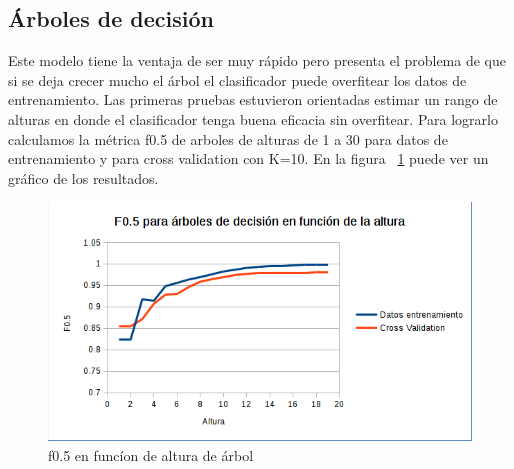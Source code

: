 
\subsection{Árboles de decisión}

Este modelo tiene la ventaja de ser muy rápido pero presenta el problema de que si se deja crecer mucho el árbol el clasificador puede overfitear los datos de entrenamiento. Las primeras pruebas estuvieron orientadas estimar un rango de alturas en donde el clasificador tenga buena eficacia sin overfitear. Para lograrlo calculamos la métrica  f0.5 de arboles de alturas de 1 a 30 para datos de entrenamiento y para cross validation con K=10. En la figura ~\ref{fig:arboles_f05_en_funcion_altura} puede ver un gráfico de los resultados.

\begin{figure}[H]
    \centering
        \includegraphics[width=\textwidth]{plots/arboles_f05_en_funcion_altura.png}
        \caption{f0.5 en funcíon de altura de árbol}
        \label{fig:arboles_f05_en_funcion_altura}
\end{figure}

